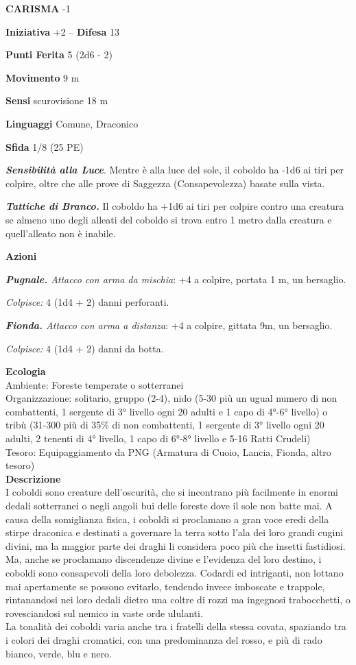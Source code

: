 \begin{multicols}{2}
\textbf{CARISMA} -1

\textbf{Iniziativa} +2 -- \textbf{Difesa} 13

\textbf{Punti Ferita} 5 (2d6 - 2)

\textbf{Movimento} 9 m

\textbf{Sensi} scurovisione 18 m

\textbf{Linguaggi} Comune, Draconico

\textbf{Sfida} 1/8 (25 PE)

\emph{\textbf{Sensibilità alla Luce}}. Mentre è alla luce del sole, il coboldo ha -1d6 ai tiri per colpire, oltre che alle prove di Saggezza (Consapevolezza) basate sulla vista.

\emph{\textbf{Tattiche di Branco.}} Il coboldo ha +1d6 ai tiri per colpire contro una creatura se almeno uno degli alleati del coboldo si trova entro 1 metro dalla creatura e quell'alleato non è inabile.

\textbf{Azioni}

\emph{\textbf{Pugnale.} Attacco con arma da mischia}: +4 a colpire,
portata 1 m, un bersaglio.

\emph{Colpisce:} 4 (1d4 + 2) danni perforanti.

\emph{\textbf{Fionda.} Attacco con arma a distanza}: +4 a colpire, gittata 9m, un bersaglio.

\emph{Colpisce:} 4 (1d4 + 2) danni da botta.

\textbf{Ecologia}\\
Ambiente: Foreste temperate o sotterranei\\
Organizzazione: solitario, gruppo (2-4), nido (5-30 più un ugual numero di non combattenti, 1 sergente di 3° livello ogni 20 adulti e 1 capo di 4°-6° livello) o tribù (31-300 più di 35\% di non combattenti, 1 sergente di 3° livello ogni 20 adulti, 2 tenenti di 4° livello, 1 capo di 6°-8° livello e 5-16 Ratti Crudeli)\\
Tesoro: Equipaggiamento da PNG (Armatura di Cuoio, Lancia, Fionda, altro tesoro)\\
\textbf{Descrizione}\\
I coboldi sono creature dell'oscurità, che si incontrano più facilmente in enormi dedali sotterranei o negli angoli bui delle foreste dove il sole non batte mai. A causa della somiglianza fisica, i coboldi si proclamano a gran voce eredi della stirpe draconica e destinati a governare la terra sotto l'ala dei loro grandi cugini divini, ma la maggior parte dei draghi li considera poco più che insetti fastidiosi. Ma, anche se proclamano discendenze divine e l'evidenza del loro destino, i coboldi sono consapevoli della loro debolezza. Codardi ed intriganti, non lottano mai apertamente se possono evitarlo, tendendo invece imboscate e trappole, rintanandosi nei loro dedali dietro una coltre di rozzi ma ingegnosi trabocchetti, o rovesciandosi sul nemico in vaste orde ululanti.\\
La tonalità dei coboldi varia anche tra i fratelli della stessa covata, spaziando tra i colori dei draghi cromatici, con una predominanza del rosso, e più di rado bianco, verde, blu e nero.\\



\end{multicols}
